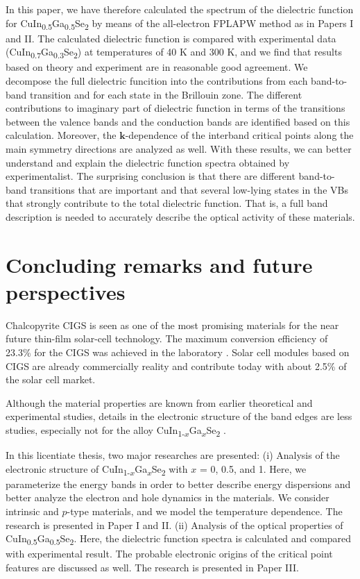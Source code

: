 \documentclass[a4paper, 12pt, titlepage,oneside,drop]{kthesis}
\begin{document}
\noindent In this paper, we have therefore calculated the spectrum of the dielectric function for CuIn\textsubscript{0.5}Ga\textsubscript{0.5}Se\textsubscript{2} by means of the all-electron FPLAPW method as in Papers I and II. 
The calculated dielectric function is compared with experimental data (CuIn\textsubscript{0.7}Ga\textsubscript{0.3}Se\textsubscript{2}) at temperatures of 40 K and 300 K, and we find that results based on theory and experiment are in reasonable good agreement. We decompose the full dielectric funcition into the contributions from each band-to-band transition and for each state in the Brillouin zone.  The different contributions to imaginary part of dielectric function in terms of the transitions between the valence bands and the conduction bands are identified based on this
calculation. Moreover, the $\textbf{k}$-dependence of the interband critical points along the main symmetry directions are analyzed as well. With these results, we can better understand and explain the dielectric function spectra obtained
by experimentalist. The surprising conclusion is that there are different band-to-band transitions that are important and that several low-lying states in the VBs that strongly contribute to the total dielectric function. That is, a full band description is needed to accurately describe the optical activity of these materials.




\section{Concluding remarks and future perspectives}

\noindent Chalcopyrite CIGS is seen as one of the most promising materials for the near future 
thin-film solar-cell technology. The maximum conversion efficiency of 23.3\% for the CIGS was achieved in the 
laboratory \cite{ward2014cu}. Solar cell modules based on CIGS are already commercially reality and contribute today with 
about 2.5\% of the solar cell market.
 
Although the material properties are known from earlier theoretical and experimental 
studies, details in the electronic structure of the band edges are less studies, especially not for the alloy CuIn{\textsubscript{1-$x$}}Ga{\textsubscript{$x$}}Se\textsubscript{2} .

In this licentiate thesis, two major researches are presented: (i) Analysis of the electronic structure 
of CuIn{\textsubscript{1-$x$}}Ga{\textsubscript{$x$}}Se\textsubscript{2} with $x$ = 0, 0.5, and 1. 
Here, we parameterize the energy bands in order to better describe energy dispersions and better analyze 
the electron and hole dynamics in the materials. We consider intrinsic and $p$-type  materials, and we model
the temperature dependence. The research is presented in Paper I and II.
(ii) Analysis of the optical properties of CuIn{\textsubscript{0.5}}Ga{\textsubscript{0.5}}Se\textsubscript{2}. 
Here, the dielectric function spectra is calculated and compared with experimental result. 
The probable electronic origins of the critical point features are discussed as well.
The research is presented in Paper III.
\end{document}
